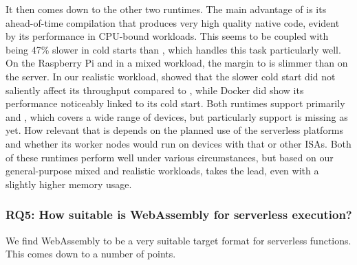 It then comes down to the other two runtimes. The main advantage of  is its ahead-of-time compilation that produces very high quality native code, evident by its performance in CPU-bound workloads. This seems to be coupled with being 47\% slower in cold starts than , which handles this task particularly well. On the Raspberry Pi and in a mixed workload, the margin to  is slimmer than on the server.
In our realistic workload,  showed that the slower cold start did not saliently affect its throughput compared to , while Docker did show its performance noticeably linked to its cold start.
Both runtimes support primarily  and , which covers a wide range of devices, but particularly  support is missing as yet. How relevant that is depends on the planned use of the serverless platforms and whether its worker nodes would run on devices with that or other ISAs.
Both of these runtimes perform well under various circumstances, but based on our general-purpose mixed and realistic workloads,  takes the lead, even with a slightly higher memory usage.



\subsubsection*{RQ5: How suitable is WebAssembly for serverless execution?}

We find WebAssembly to be a very suitable target format for serverless functions. This comes down to a number of points.

